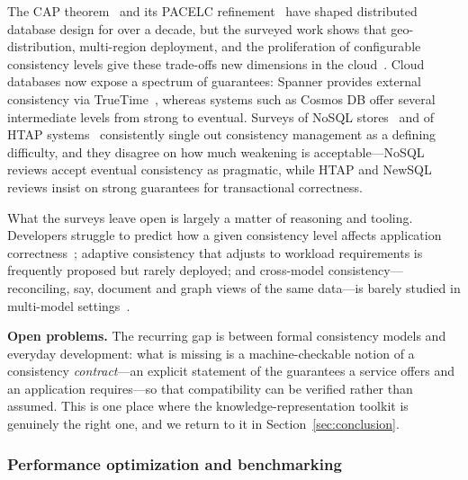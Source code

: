 \documentclass[a4paper,fleqn]{cas-sc}
\begin{document}
The CAP theorem~\cite{Brewer2012CAP} and its PACELC refinement~\cite{Abadi2012PACELC} have shaped distributed database design for over a decade, but the surveyed work shows that geo-distribution, multi-region deployment, and the proliferation of configurable consistency levels give these trade-offs new dimensions in the cloud~\cite{Viotti2016Consistency}. Cloud databases now expose a spectrum of guarantees: Spanner provides external consistency via TrueTime~\cite{Corbett2013Spanner}, whereas systems such as Cosmos DB offer several intermediate levels from strong to eventual. Surveys of NoSQL stores~\cite{Davoudian2018NoSQL,Kaur2021NoSQLReview} and of HTAP systems~\cite{Haas2024HTAPSurvey} consistently single out consistency management as a defining difficulty, and they disagree on how much weakening is acceptable---NoSQL reviews accept eventual consistency as pragmatic, while HTAP and NewSQL reviews insist on strong guarantees for transactional correctness.

What the surveys leave open is largely a matter of reasoning and tooling. Developers struggle to predict how a given consistency level affects application correctness~\cite{Viotti2016Consistency}; adaptive consistency that adjusts to workload requirements is frequently proposed but rarely deployed; and cross-model consistency---reconciling, say, document and graph views of the same data---is barely studied in multi-model settings~\cite{Lu2019MultiModel}.

\textbf{Open problems.} The recurring gap is between formal consistency models and everyday development: what is missing is a machine-checkable notion of a consistency \emph{contract}---an explicit statement of the guarantees a service offers and an application requires---so that compatibility can be verified rather than assumed. This is one place where the knowledge-representation toolkit is genuinely the right one, and we return to it in Section~\ref{sec:conclusion}.

\subsubsection{Performance optimization and benchmarking}
\label{subsubsec:performance}
\end{document}
